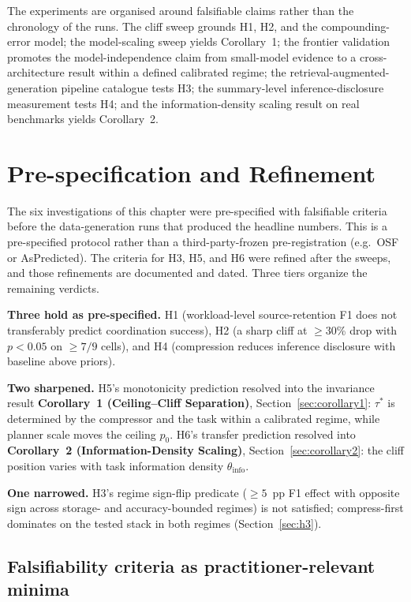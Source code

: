 The experiments are organised around falsifiable claims rather than
the chronology of the runs. The cliff sweep grounds H1, H2, and the
compounding-error model; the model-scaling sweep yields Corollary~1; the
frontier validation promotes the model-independence claim from
small-model evidence to a cross-architecture result within a defined
calibrated regime; the retrieval-augmented-generation pipeline
catalogue tests H3; the summary-level inference-disclosure measurement
tests H4; and the information-density scaling result on real benchmarks
yields Corollary~2.

\section{Pre-specification and Refinement}
\label{sec:prereg_refinement}

The six investigations of this chapter were pre-specified with
falsifiable criteria before the data-generation runs that produced the
headline numbers. This
is a pre-specified protocol rather than a third-party-frozen
pre-registration (e.g.\ OSF or AsPredicted). The criteria for H3, H5,
and H6 were refined after the sweeps, and those refinements are
documented and dated. Three tiers organize the remaining verdicts.

\textbf{Three hold as pre-specified.} H1 (workload-level
source-retention F1 does not transferably predict coordination
success), H2 (a sharp cliff at \mbox{$\ge\!30$\%} drop with $p<0.05$ on
\mbox{$\ge\!7/9$} cells), and H4 (compression reduces inference
disclosure with baseline above priors).

\textbf{Two sharpened.} H5's monotonicity prediction resolved into the
invariance result \textbf{Corollary~1 (Ceiling--Cliff Separation)},
Section~\ref{sec:corollary1}: $\tau^{*}$ is determined by the
compressor and the task within a calibrated regime, while planner scale
moves the ceiling $p_0$. H6's transfer prediction resolved into
\textbf{Corollary~2 (Information-Density Scaling)},
Section~\ref{sec:corollary2}: the cliff position varies with task
information density $\theta_\text{info}$.

\textbf{One narrowed.} H3's regime sign-flip predicate ($\ge\!5$~pp F1
effect with opposite sign across storage- and accuracy-bounded regimes)
is not satisfied; compress-first dominates on the tested stack in both
regimes (Section~\ref{sec:h3}).

\subsection{Falsifiability criteria as practitioner-relevant minima}
\label{sec:prereg_criteria_defense}

